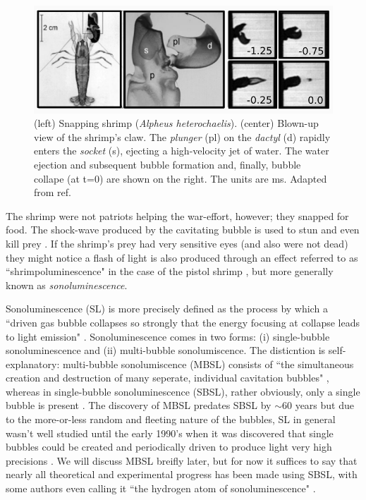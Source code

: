 \documentclass[rmp,aps,nofootinbib,superscriptaddress,floatfix]{revtex4-2}
\begin{document}
\begin{figure}
\includegraphics[width=0.9\linewidth]{figs/shrimp_claw.pdf}
    \caption{(left) Snapping shrimp (\emph{Alpheus heterochaelis}). (center) Blown-up view of the shrimp's claw. The \emph{plunger} (pl) on the \emph{dactyl} (d) rapidly enters the \emph{socket} (s), ejecting a high-velocity jet of water. The water ejection and subsequent bubble formation and, finally, bubble collape (at t=0) are shown on the right. The units are ms. Adapted from ref. \cite{versluis2000snapping}}
\label{fig:shrimp_claw}
\end{figure}

The shrimp were not patriots helping the war-effort, however; they snapped for food. The shock-wave produced by the cavitating bubble is used to stun and even kill prey \cite{versluis2000snapping}. If the shrimp's prey had very sensitive eyes (and also were not dead) they might notice a flash of light is also produced through an effect referred to as ``shrimpoluminescence" in the case of the pistol shrimp \cite{lohse2001snapping}, but more generally known as \emph{sonoluminescence}.

Sonoluminescence (SL) is more precisely defined as the process by which a ``driven gas bubble collapses so strongly that the energy focusing at collapse leads to light emission" \cite{brenner2002single}. Sonoluminescence comes in two forms: (i) single-bubble sonoluminescence and (ii) multi-bubble sonolumiscence. The disticntion is self-explanatory: multi-bubble sonolumiscence (MBSL) consists of  ``the simultaneous creation and destruction of many seperate, individual cavitation bubbles" \cite{crum1994sonoluminescence,brenner2002single}, whereas in single-bubble sonoluminescence (SBSL), rather obviously, only a single bubble is present \cite{gaitan1992sonoluminescence}. The discovery of MBSL predates SBSL by $\sim$60 years but due to the more-or-less random and fleeting nature of the bubbles, SL in general wasn't well studied until the early 1990's when it was discovered that single bubbles could be created and periodically driven to produce light very high precisions \cite{crum1994sonoluminescence,gaitan1990experimental,gaitan1992sonoluminescence,brenner2002single}. We will discuss MBSL breifly later, but for now it suffices to say that nearly all theoretical and experimental progress has been made using SBSL, with some authors even calling it ``the hydrogen atom of sonoluminescence" \cite{lohse2018bubble,crum1994sonoluminescence}.
\end{document}
